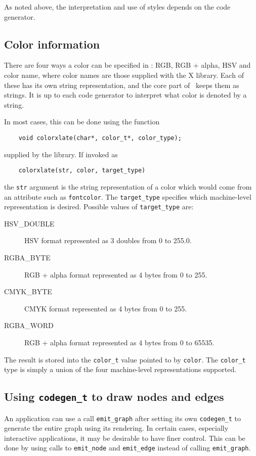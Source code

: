 As noted above, the interpretation and use of styles depends on the
code generator.

\subsection{Color information}
\label{sec:color}

There are four ways a color can be specified in \gviz: RGB,
RGB + alpha, HSV and color name, where color names are those supplied
with the X library. Each of these has its own string representation,
and the core part of \gviz\ keeps them as strings. It is up to each
code generator to interpret what color is denoted by a string.

In most cases, this can be done using the function
\begin{verbatim}
    void colorxlate(char*, color_t*, color_type);
\end{verbatim}
supplied by the library. If invoked as 
\begin{verbatim}
    colorxlate(str, color, target_type)
\end{verbatim}
the {\tt str} argument is the string
representation of a color which would come from an attribute such
as {\tt fontcolor}. The {\tt target\_type} specifies which
machine-level representation is desired. Possible values of
{\tt target\_type} are:
\begin{description}
\item[HSV\_DOUBLE] HSV format represented as 3 doubles from 0 to 255.0.
\item[RGBA\_BYTE] RGB + alpha format represented as 4 bytes from 0 to 255.
\item[CMYK\_BYTE] CMYK format represented as 4 bytes from 0 to 255.
\item[RGBA\_WORD] RGB + alpha format represented as 4 bytes from 0 to 65535.
\end{description}
The result is stored into the {\tt color\_t} value pointed to by {\tt color}.
The {\tt color\_t} type is simply a union of the four machine-level
representations supported.

\subsection{Using {\tt codegen\_t} to draw nodes and edges}
\label{sec:applcodegen}

An application can use a call \verb+emit_graph+ after setting its
own {\tt codegen\_t} to generate the entire graph using its rendering.
In certain cases, especially interactive applications, it may be desirable
to have finer control. This can be done by using calls to {\tt emit\_node}
and {\tt emit\_edge} instead of calling \verb+emit_graph+.  

